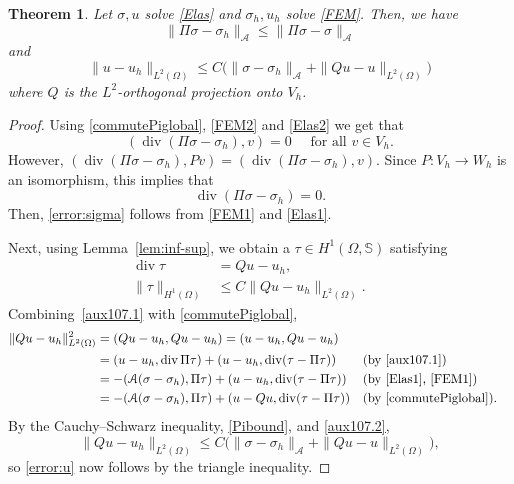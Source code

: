 \documentclass[12pt]{amsart}
\numberwithin{equation}{section}
\DeclareMathOperator{\divg}{div}
\newtheorem{theorem}{Theorem}[section]
\theoremstyle{definition}
\theoremstyle{remark}
\renewcommand{\(}{\bigl(}
\renewcommand{\)}{\bigr)}
\newcommand{\Aa}{\mathcal{A}}
\begin{document}
\begin{theorem}\label{mainerrorthm}
  Let $\sigma, u$ solve \eqref{Elas}
  and $\sigma_h, u_h$ solve \eqref{FEM}.
  Then, we have 
\begin{equation}\label{error:sigma}
\|\Pi \sigma-\sigma_h\|_\Aa \le \| \Pi \sigma-\sigma\|_\Aa
\end{equation}
and
\begin{equation}\label{error:u}
  \|u-u_h\|_{L^2(\Omega)} \le C \big(\| \sigma-\sigma_h\|_\Aa
  + \|Q u-u\|_{L^2(\Omega)}\big)
\end{equation}
where  $Q$ is the $L^2$-orthogonal projection onto $V_h$.
\end{theorem}
\begin{proof}

Using \eqref{commutePiglobal}, \eqref{FEM2} and \eqref{Elas2} we get that 
\begin{equation*}
(\divg (\Pi \sigma-\sigma_h), v)=0  \quad {\text{ for all }} v \in V_h.
\end{equation*}
However, $(\divg (\Pi \sigma-\sigma_h), P v)= (\divg (\Pi \sigma-\sigma_h), v)$. Since $P: V_h \rightarrow W_h$ is an isomorphism, this implies that
\begin{equation}\label{divsig}
\divg (\Pi \sigma-\sigma_h)=0.
\end{equation}
Then, \eqref{error:sigma} follows from \eqref{FEM1} and \eqref{Elas1}.

Next, using Lemma~\ref{lem:inf-sup}, we obtain a
$\tau \in H^1(\Omega, \mathbb{S})$ satisfying 
\begin{align}
  \divg \tau & = Q u-u_h,  \qquad  && \label{aux107.1}   \\
  \|\tau\|_{H^1(\Omega)} & \le  C \| Qu-u_h\|_{L^2(\Omega)}. \label{aux107.2}  
\end{align}
Combining~\eqref{aux107.1} with   \eqref{commutePiglobal}, 
\begin{align*}
  \| Qu-u_h\|_{L^2(\Omega)}^2&= (Qu-u_h, Qu-u_h)
                               = (u-u_h, Qu - u_h)
  \\
    &= (u-u_h, \divg \Pi \tau)+(u-u_h, \divg(\tau-\Pi \tau)) && \text{(by~\eqref{aux107.1})} \\
    &=-(\Aa(\sigma - \sigma_h), \Pi \tau) + (u-u_h, \divg(\tau-\Pi \tau)) && \text{(by~\eqref{Elas1}, \eqref{FEM1})} \\
    &=-(\Aa(\sigma - \sigma_h), \Pi \tau) + (u-Qu, \divg(\tau-\Pi \tau)) && \text{(by~\eqref{commutePiglobal}).}
\end{align*}
By the Cauchy--Schwarz inequality, \eqref{Pibound}, and \eqref{aux107.2}, 
\begin{equation*}
\|Qu-u_h\|_{L^2(\Omega)} \le C \big(\| \sigma-\sigma_h\|_{\Aa}+ \|Q u-u\|_{L^2(\Omega)}\big),
\end{equation*}
so \eqref{error:u} now follows by the triangle inequality. 
\end{proof}
\end{document}

